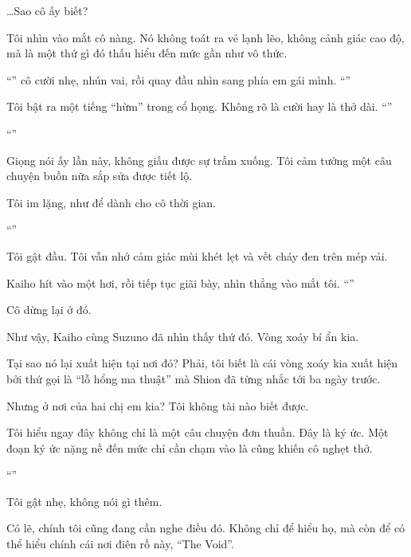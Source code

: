 \documentclass[../main.tex]{subfiles}
\begin{document}
\dots Sao cô ấy biết?

Tôi nhìn vào mắt cô nàng. Nó không toát ra vẻ lạnh lẽo, không cảnh giác cao độ, mà là một thứ gì đó thấu hiểu đến mức gần như vô thức.

``'' cô cười nhẹ, nhún vai, rồi quay đầu nhìn sang phía em gái mình. ``''

Tôi bật ra một tiếng ``hừm'' trong cổ họng. Không rõ là cười hay là thở dài. ``''

``''

Giọng nói ấy lần này, không giấu được sự trầm xuống. Tôi cảm tưởng một câu chuyện buồn nữa sắp sửa được tiết lộ.

Tôi im lặng, như để dành cho cô thời gian.

``''

Tôi gật đầu. Tôi vẫn nhớ cảm giác mùi khét lẹt và vết cháy đen trên mép vải.

Kaiho hít vào một hơi, rồi tiếp tục giãi bày, nhìn thẳng vào mắt tôi. ``''

Cô dừng lại ở đó.

Như vậy, Kaiho cùng Suzuno đã nhìn thấy thứ đó. Vòng xoáy bí ẩn kia.

Tại sao nó lại xuất hiện tại nơi đó? Phải, tôi biết là cái vòng xoáy kia xuất hiện bởi thứ gọi là ``lỗ hổng ma thuật'' mà Shion đã từng nhắc tới ba ngày trước.

Nhưng ở nơi của hai chị em kia? Tôi không tài nào biết được.

Tôi hiểu ngay đây không chỉ là một câu chuyện đơn thuần. Đây là ký ức. Một đoạn ký ức nặng nề đến mức chỉ cần chạm vào là cũng khiến cô nghẹt thở.

``''

Tôi gật nhẹ, không nói gì thêm.

Có lẽ, chính tôi cũng đang cần nghe điều đó. Không chỉ để hiểu họ, mà còn để có thể hiểu chính cái nơi điên rồ này, ``The Void''.
\end{document}
